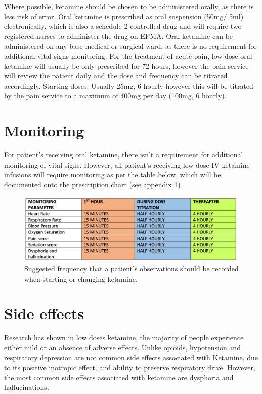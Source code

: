 \documentclass[
]{book}
\begin{document}
Where possible, ketamine should be chosen to be administered orally, as there is less risk of error. Oral ketamine is prescribed as oral suspension (50mg/ 5ml) electronically, which is also a schedule 2 controlled drug and will require two registered nurses to administer the drug on EPMA. Oral ketamine can be administered on any base medical or surgical ward, as there is no requirement for additional vital signs monitoring. For the treatment of acute pain, low dose oral ketamine will usually be only prescribed for 72 hours, however the pain service will review the patient daily and the dose and frequency can be titrated accordingly.
Starting doses:
Usually 25mg, 6 hourly however this will be titrated by the pain service to a maximum of 400mg per day (100mg, 6 hourly).

\hypertarget{monitoring}{%
\chapter{Monitoring}\label{monitoring}}

For patient's receiving oral ketamine, there isn't a requirement for additional monitoring of vital signs. However, all patient's receiving low dose IV ketamine infusions will require monitoring as per the table below, which will be documented onto the prescription chart (see appendix 1)

\begin{figure}
\includegraphics[width=0.7\linewidth]{pdf_monitor} \caption{Suggested frequency that a patient's observations should be recorded when starting or changing ketamine.}\label{fig:nice-fig}
\end{figure}

\hypertarget{side-effects}{%
\chapter{Side effects}\label{side-effects}}

Research has shown in low doses ketamine, the majority of people experience either mild or an absence of adverse effects. Unlike opioids, hypotension and respiratory depression are not common side effects associated with Ketamine, due to its positive inotropic effect, and ability to preserve respiratory drive. However, the most common side effects associated with ketamine are dysphoria and hallucinations.
\end{document}
